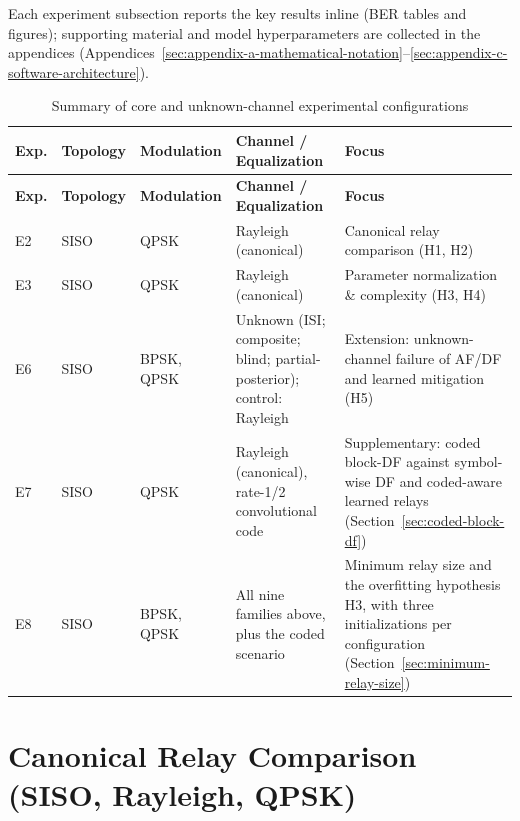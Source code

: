 Each experiment subsection reports the key results inline (BER tables and figures); supporting material and model hyperparameters are collected in the appendices (Appendices~\ref{sec:appendix-a-mathematical-notation}--\ref{sec:appendix-c-software-architecture}).

\begin{longtable}{p{0.6cm} p{2.2cm} p{2.1cm} p{3.6cm} p{3.9cm}}
\caption[Summary of experimental configurations]{Summary of core and unknown-channel experimental configurations}
\label{tab:experiment-summary}\\
\hline
\textbf{Exp.} &
\textbf{Topology} &
\textbf{Modulation} &
\textbf{Channel / Equalization} &
\textbf{Focus} \\
\hline
\endfirsthead

\hline
\textbf{Exp.} &
\textbf{Topology} &
\textbf{Modulation} &
\textbf{Channel / Equalization} &
\textbf{Focus} \\
\hline
\endhead

E2 & SISO & QPSK &
Rayleigh (canonical) &
Canonical relay comparison (H1, H2) \\
\hline

E3 & SISO & QPSK &
Rayleigh (canonical) &
Parameter normalization \& complexity (H3, H4) \\
\hline

E6 & SISO & BPSK, QPSK &
Unknown (ISI; composite; blind; partial-posterior); control: Rayleigh &
Extension: unknown-channel failure of AF/DF and learned mitigation (H5) \\
\hline

E7 & SISO & QPSK &
Rayleigh (canonical), rate-1/2 convolutional code &
Supplementary: coded block-DF against symbol-wise DF and coded-aware learned relays (Section~\ref{sec:coded-block-df}) \\
\hline

E8 & SISO & BPSK, QPSK &
All nine families above, plus the coded scenario &
Minimum relay size and the overfitting hypothesis H3, with three initializations per configuration (Section~\ref{sec:minimum-relay-size}) \\

\hline
\end{longtable}

\section{Canonical Relay Comparison (SISO, Rayleigh, QPSK)}\label{sec:siso-bpsk-performance-baseline-relay-comparison}

